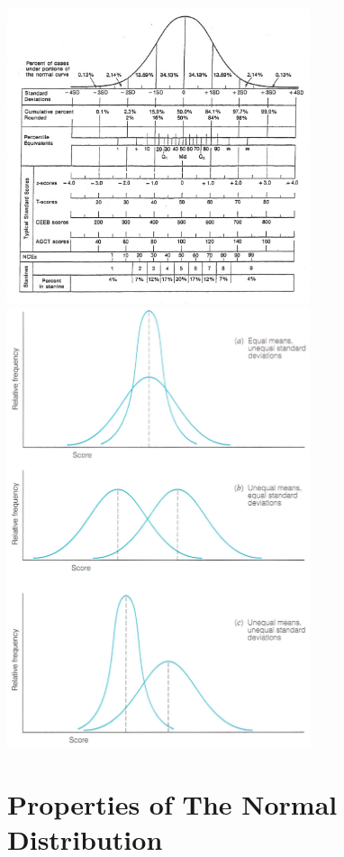 \documentclass[12pt]{article}
\begin{document}
\includegraphics[width=3.5in]{standardscores.png}
\includegraphics[width=3.5in]{normdist_different.png}

\section{Properties of The Normal
Distribution}\label{properties-of-the-normal-distribution}
\end{document}
